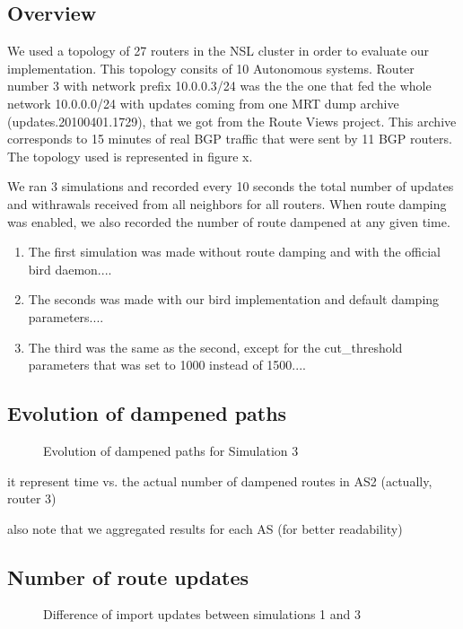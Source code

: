 \documentclass[a4paper,english]{IEEEtran}
\begin{document}
\subsection{Overview}

We used a topology of 27 routers in the NSL cluster in order to evaluate
our implementation. This topology consits of 10 Autonomous systems.
Router number 3 with network prefix 10.0.0.3/24 was the the one that
fed the whole network 10.0.0.0/24 with updates coming from one MRT
dump archive (updates.20100401.1729), that we got from the Route Views
project\cite{routeviews}. This archive corresponds to 15 minutes
of real BGP traffic that were sent by 11 BGP routers. The topology
used is represented in figure x.

We ran 3 simulations and recorded every 10 seconds the total number
of updates and withrawals received from all neighbors for all routers.
When route damping was enabled, we also recorded the number of route
dampened at any given time. 
\begin{enumerate}
\item The first simulation was made without route damping and with the official
bird daemon.... 
\item The seconds was made with our bird implementation and default damping
parameters.... 
\item The third was the same as the second, except for the cut\_threshold
parameters that was set to 1000 instead of 1500.... 
\end{enumerate}

\subsection{Evolution of dampened paths}

\begin{figure}
\caption{Evolution of dampened paths for Simulation 3}

\end{figure}

it represent time vs. the actual number of dampened routes in AS2
(actually, router 3)

also note that we aggregated results for each AS (for better readability)


\subsection{Number of route updates}

\begin{figure}
\caption{Difference of import updates between simulations 1 and 3}

\end{figure}
\end{document}
